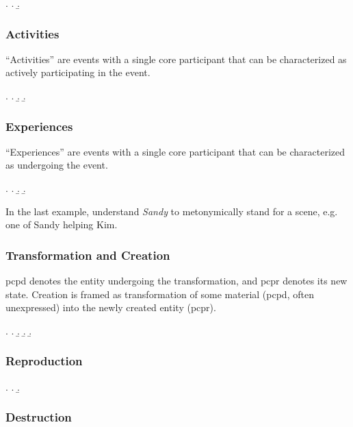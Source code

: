\documentclass[a4paper]{article}
\begin{document}
\ex. \a. 
     \b. 

\subsubsection{Activities}

``Activities'' are events with a single core participant that can be
characterized as actively participating in the event.

\ex. \a. 
     \b. 
     \b. 

\subsubsection{Experiences}

``Experiences'' are events with a single core participant that can be
characterized as undergoing the event.

\ex. \a. 
     \b. 
     \b. 

In the last example, understand \emph{Sandy} to metonymically stand for a scene,
e.g. one of Sandy helping Kim.

\subsubsection{Transformation and Creation}

\textsf{pcpd} denotes the entity undergoing the transformation, and
\textsf{pcpr} denotes its new state. Creation is framed as transformation of
some material (\textsf{pcpd}, often unexpressed) into the newly created entity
(\textsf{pcpr}).

\ex. \a. 
     \b. 
     \b. 
     \b. 

\subsubsection{Reproduction}

\ex. \a. 
     \b. 

\subsubsection{Destruction}
\end{document}

